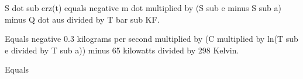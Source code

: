 S dot sub erz(t) equals negative m dot multiplied by (S sub e minus S sub a) minus Q dot aus divided by T bar sub KF.  

Equals negative 0.3 kilograms per second multiplied by (C multiplied by ln(T sub e divided by T sub a)) minus 65 kilowatts divided by 298 Kelvin.  

Equals